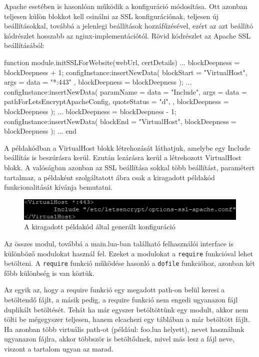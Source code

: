 Apache esetében is hasonlóan működik a konfiguráció módosítása. Ott azonban teljesen külön blokkot kell csinálni az SSL konfigurációnak, teljesen új beállításokkal, továbbá a jelenlegi beállítások hozzáfűzésével, ezért az azt beállító kódrészlet hosszabb az nginx-implementációtól. Rövid kódrészlet az Apache SSL beállításából:
\begin{lua}
function module.initSSLForWebsite(webUrl, certDetails)
    ...
    blockDeepness = blockDeepness + 1;
    configInstance:insertNewData({
        blockStart = "VirtualHost",
        args = {
            {data = "*:443"}
        },
        blockDeepness = blockDeepness
    });
    ...
    configInstance:insertNewData({
        paramName = {data = "Include"},
        args = {
            {data = pathForLetsEncryptApacheConfig, quoteStatus = "d"},
        },
        blockDeepness = blockDeepness
    });
    ...
    blockDeepness = blockDeepness - 1;
    configInstance:insertNewData({
        blockEnd = "VirtualHost",
        blockDeepness = blockDeepness
    });
    ...
end
\end{lua}

\pagebreak

A példakódban a VirtualHost blokk létrehozását láthatjuk, amelybe egy Include beállítás is beszúrásra kerül. Ezután lezárásra kerül a létrehozott VirtualHost blokk. A valóságban azonban az SSL beállítása sokkal több beállítást, paramétert tartalmaz, a példaként szolgáltatott  ábra csak a kiragadott példakód funkcionalitását kívánja bemutatni.
\begin{figure}[t]
\centering
\includegraphics[scale=1.0]{images/apache_config_edit_example.png}
\caption{A kiragadott példakód által generált konfiguráció}
\label{fig:newly_inserted_apache_block}
\end{figure}


Az összes modul, továbbá a main.lua-ban található felhasználói interface is különböző modulokat használ fel. Ezeket a modulokat a \texttt{require} funkcióval lehet betölteni. A \texttt{require} funkció működése hasonló a \texttt{dofile} funkcióhoz, azonban két főbb különbség is van köztük. 

Az egyik az, hogy a require funkció egy megadott path-on belül keresi a betöltendő fájlt, a másik pedig, a require funkció nem engedi ugyanazon fájl duplikált betöltését. Tehát ha már egyszer betöltöttünk egy modult, akkor nem tölti be mégegyszer teljesen, hanem elcachezi egy táblában a már betöltött fájlt. Ha azonban több virtuális path-ot (például: \texttt{} foo.lua helyett), nevet használunk ugyanazon fájlra, akkor többször is betöltődnek, mivel más lesz a fájl neve, viszont a tartalom ugyan az marad. \cite{require}

